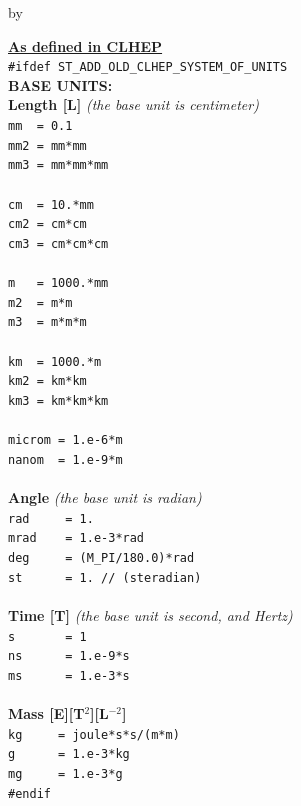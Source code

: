 \documentclass[twoside]{article}
\newcommand{\entrylabel}[1]{\mbox{\textbf{{#1}}}\hfil}%
\newenvironment{entry}
{\begin{list}{}%
    {\renewcommand{\makelabel}{\entrylabel}%
     \setlength{\labelwidth}{90pt}%
     \setlength{\leftmargin}{\labelwidth}
     \advance\leftmargin by \labelsep%
      }%
    }%
  {\end{list}}
\newcommand{\Entrylabel}[1]%
{\raisebox{0pt}[1ex][0pt]{\makebox[\labelwidth][l]%
    {\parbox[t]{\labelwidth}{\hspace{0pt}\textbf{{#1}}}}}}
\newenvironment{Entry}%
{\renewcommand{\entrylabel}{\Entrylabel}\begin{entry}}%
  {\end{entry}}
\begin{document}
\begin{Entry}
  {\bf \underline{As defined in CLHEP}} \\
  \verb+#ifdef ST_ADD_OLD_CLHEP_SYSTEM_OF_UNITS+ \\  
{\bf BASE UNITS: \\Length [L]} {\it (the base unit is centimeter)}\\
  \verb+mm  = 0.1+ \\  
  \verb+mm2 = mm*mm+\\
  \verb+mm3 = mm*mm*mm+\\ \\
  \verb+cm  = 10.*mm+ \\
  \verb+cm2 = cm*cm+ \\
  \verb+cm3 = cm*cm*cm+ \\ \\
  \verb+m   = 1000.*mm+ \\  
  \verb+m2  = m*m+ \\
  \verb+m3  = m*m*m+ \\ \\
  \verb+km  = 1000.*m+ \\
  \verb+km2 = km*km+ \\
  \verb+km3 = km*km*km+ \\ \\
  \verb+microm = 1.e-6*m+ \\
  \verb+nanom  = 1.e-9*m+ \\ \\
  {\bf Angle} {\it (the base unit is radian)}\\
  \verb+rad     = 1.+  \\ 
  \verb+mrad    = 1.e-3*rad+  \\ 
  \verb+deg     = (M_PI/180.0)*rad+ \\
  \verb+st      = 1. // (steradian)+\\ \\
{\bf Time [T]} {\it (the base unit is second, and Hertz)}\\
  \verb#s       = 1# \\
  \verb+ns      = 1.e-9*s+ \\ 
  \verb+ms      = 1.e-3*s+ \\ \\ 
{\bf Mass [E][T$^{2}$][L$^{-2}$]} \\
  \verb+kg     = joule*s*s/(m*m)+ \\
  \verb+g      = 1.e-3*kg+ \\
  \verb+mg     = 1.e-3*g+ \\
  \verb+#endif+ \\ \\


\end{Entry}
\end{document}
